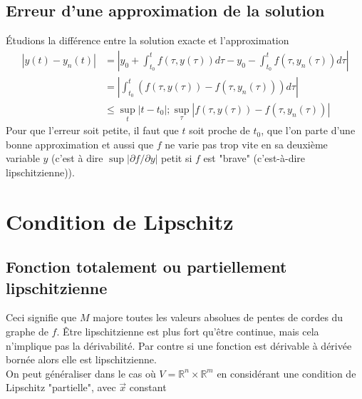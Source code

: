 	\subsection{Erreur d'une approximation de la solution}
	Étudions la différence entre la solution exacte et l'approximation
	\begin{equation}
	\begin{array}{ll}
	|y(t) - y_n(t)| &= |y_0 + \int_{t_0}^t f(\tau,y(\tau))d\tau - y_0 - \int_{t_0}^t 
	f(\tau, y_n(\tau))d\tau|\\
	 &= |\int_{t_0}^t (f(\tau,y(\tau)) - f(\tau,y_n(\tau)))d\tau|\\
	 &\leq \sup_t |t-t_0| ; \sup_\tau |f(\tau,y(\tau)) - f(\tau,y_n(\tau))|
	\end{array}
	\end{equation}
	Pour que l'erreur soit petite, il faut que $t$ soit proche de $t_0$, que l'on 
	parte d'une bonne approximation et aussi que $f$ ne varie pas trop vite en sa 
	deuxième variable $y$ (c'est à dire $\sup |\partial f/\partial y|$ petit si 
	$f$ est "brave" (c'est-à-dire lipschitzienne)).
	
	
\section{Condition de Lipschitz}
	\subsection{Fonction totalement ou partiellement lipschitzienne}
	Ceci signifie que $M$ majore toutes les valeurs absolues de pentes de cordes 
	du graphe de $f$. Être lipschitzienne est plus fort qu'être continue, mais 
	cela n'implique pas la dérivabilité. Par contre si une fonction est dérivable 
	à dérivée bornée alors elle est lipschitzienne.\\
	
	On peut généraliser dans le cas où $V = \mathbb{R}^n\times\mathbb{R}^m$ en 
	considérant une condition de Lipschitz "partielle", avec $\vec{x}$ constant 

	
